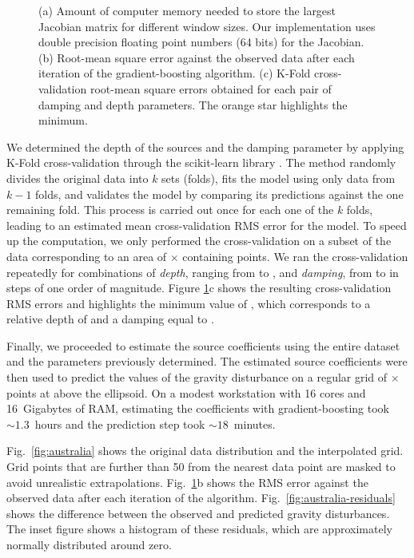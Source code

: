 \begin{figure}
    \caption{
        (a) Amount of computer memory needed to store the largest Jacobian
        matrix for different window sizes. Our implementation uses double
        precision floating point numbers (64 bits) for the Jacobian.
        (b) Root-mean square error against the observed data after each
        iteration of the gradient-boosting algorithm.
        (c) K-Fold cross-validation root-mean square errors obtained for each
        pair of damping and depth parameters. The orange star highlights the
        minimum.
    }
    \label{fig:australia-memory-cv-error}
\end{figure}

We determined the depth of the sources and the damping parameter by applying
K-Fold cross-validation through the scikit-learn library \citep{sklearn2011}.
The method randomly divides the original data into $k$ sets (folds), fits the
model using only data from $k - 1$ folds, and validates the model by comparing
its predictions against the one remaining fold.
This process is carried out once for each one of the $k$ folds, leading to
an estimated mean cross-validation RMS error for the model.
To speed up the computation, we only performed the cross-validation on a subset
of the data corresponding to an area of
\AustraliaSmallAreaEastingSize{}$\times$\AustraliaSmallAreaNorthingSize{}
containing \AustraliaSmallAreaNPoints{} points.
We ran the cross-validation repeatedly for combinations of \emph{depth},
ranging from \AustraliaDepthMin{} to \AustraliaDepthMax{},
and \emph{damping}, from \AustraliaDampingMin{} to \AustraliaDampingMax{} in
steps of one order of magnitude.
Figure \ref{fig:australia-memory-cv-error}c shows the resulting
cross-validation RMS errors and highlights the minimum value of
\AustraliaEqlRmsScore{}, which corresponds to a relative depth of
\AustraliaEqlDepth{} and a damping equal to \AustraliaEqlDamping{}.

Finally, we proceeded to estimate the source coefficients using the entire
dataset and the parameters previously determined.
The estimated source coefficients were then used to predict the values of the
gravity disturbance on a regular grid of
\AustraliaEqlGridNLongitude{}$\times$\AustraliaEqlGridNLatitude{} points at
\AustraliaEqlGridHeight{} above the ellipsoid.
On a modest workstation with 16 cores and 16~Gigabytes of RAM,
estimating the \AustraliaEqlNSources{} coefficients with gradient-boosting took
$\sim 1.3$~hours and the prediction step took $\sim 18$~minutes.

Fig.~\ref{fig:australia} shows the original data distribution and the
interpolated grid.
Grid points that are further than 50\km{} from the nearest data point are
masked to avoid unrealistic extrapolations.
Fig.~\ref{fig:australia-memory-cv-error}b shows the RMS error against the
observed data after each iteration of the algorithm.
Fig.~\ref{fig:australia-residuals} shows the difference between the observed
and predicted gravity disturbances.
The inset figure shows a histogram of these residuals, which are approximately
normally distributed around zero.

